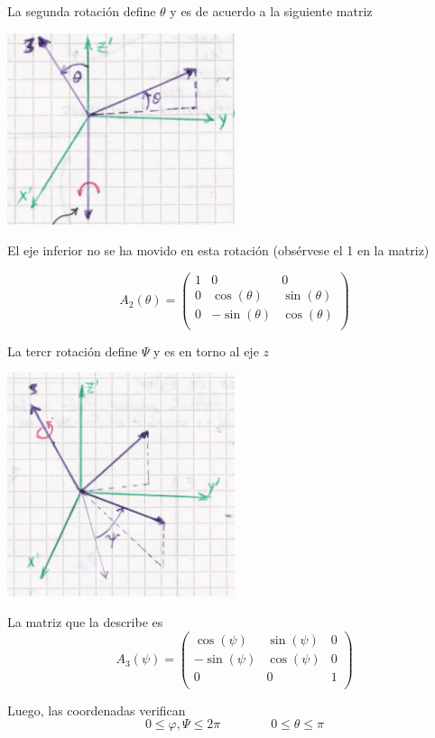 \documentclass[10pt,oneside]{CBFT_book}
\begin{document}
La segunda rotación define $\theta$ y es de acuerdo a la siguiente matriz

\includegraphics[width=0.5\textwidth]{images/fig_mc_euler_angles_2.jpg}

El eje inferior no se ha movido en esta rotación (obsérvese el 1 en la matriz)

\[
	A_2(\theta) = 
	\begin{pmatrix}
		1 & 0 & 0 \\
		0 & \cos(\theta) & \sin(\theta) \\ 
		0 & -\sin(\theta) & \cos(\theta)  \\
	\end{pmatrix}
\]

La tercr rotación define $\Psi$ y es en torno al eje $z$

\includegraphics[width=0.5\textwidth]{images/fig_mc_euler_angles_3.jpg}

La matriz que la describe es
\[
	A_3(\psi) = 
	\begin{pmatrix}
		\cos(\psi) & \sin(\psi) & 0 \\
		-\sin(\psi) & \cos(\psi) & 0 \\ 
		0 & 0 & 1  \\
	\end{pmatrix}
\]

Luego, las coordenadas verifican
\[
	0 \leq \varphi,\Psi \leq 2\pi \qquad \qquad 0 \leq \theta \leq \pi
\]
\end{document}
